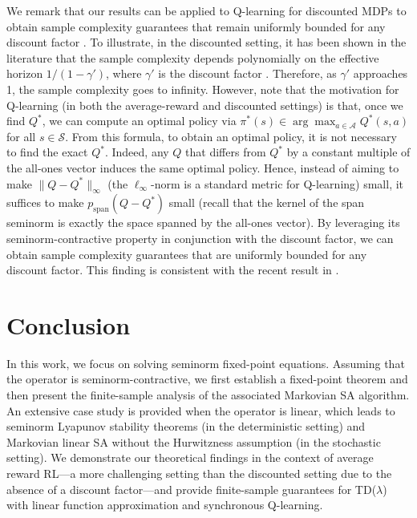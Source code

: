 \documentclass[11 pt]{article}
\begin{document}
	We remark that our results can be applied to Q-learning for discounted MDPs to obtain sample complexity guarantees that remain uniformly bounded for any discount factor \cite{devraj2021q}. To illustrate, in the discounted setting, it has been shown in the literature that the sample complexity depends polynomially on the effective horizon $1/(1-\gamma')$, where $\gamma'$ is the discount factor \cite{chen2021lyapunov,li2024q}. Therefore, as $\gamma'$ approaches 1, the sample complexity goes to infinity. However, note that the motivation for Q-learning (in both the average-reward and discounted settings) is that, once we find $Q^*$, we can compute an optimal policy via $\pi^*(s) \in \arg\max_{a \in \mathcal{A}} Q^*(s,a)$ for all $s\in\mathcal{S}$.
	From this formula, to obtain an optimal policy, it is not necessary to find the exact $Q^*$. Indeed, any $Q$ that differs from $Q^*$ by a constant multiple of the all-ones vector induces the same optimal policy. Hence, instead of aiming to make $\|Q - Q^*\|_\infty$ (the $\ell_\infty$-norm is a standard metric for Q-learning) small, it suffices to make $p_{\text{span}}(Q - Q^*)$ small (recall that the kernel of the span seminorm is exactly the space spanned by the all-ones vector). By leveraging its seminorm-contractive property in conjunction with the discount factor, we can obtain sample complexity guarantees that are uniformly bounded for any discount factor. This finding is consistent with the recent result in \cite{devraj2021q}.
	
	\section{Conclusion}\label{sec:conclusion}
	In this work, we focus on solving seminorm fixed-point equations. Assuming that the operator is seminorm-contractive, we first establish a fixed-point theorem and then present the finite-sample analysis of the associated Markovian SA algorithm. An extensive case study is provided when the operator is linear, which leads to seminorm Lyapunov stability theorems (in the deterministic setting) and Markovian linear SA without the Hurwitzness assumption (in the stochastic setting). We demonstrate our theoretical findings in the context of average reward RL—a more challenging setting than the discounted setting due to the absence of a discount factor—and provide finite-sample guarantees for TD($\lambda$) with linear function approximation and synchronous Q-learning.
	
	
	
\end{document}
